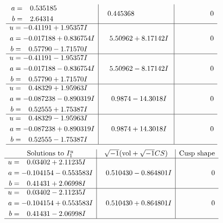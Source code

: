 \documentclass[1p]{elsarticle_modified}
\theoremstyle{definition}
\newcommand{\I}{\sqrt{-1}}
\begin{document}
$$\begin{array}{c|c|c}
\begin{aligned}
a &= \phantom{-}0.535185\phantom{ +0.000000I} \\
b &= \phantom{-}2.64314\phantom{ +0.000000I}\end{aligned}
 & \phantom{-}0.445368\phantom{ +0.000000I} & \phantom{-0.000000 } 0 \\ \hline\begin{aligned}
u &= -0.41191 + 1.95357 I \\
a &= -0.017188 + 0.836754 I \\
b &= \phantom{-}0.57790 - 1.71570 I\end{aligned}
 & \phantom{-}5.50962 + 8.17142 I & \phantom{-0.000000 } 0 \\ \hline\begin{aligned}
u &= -0.41191 - 1.95357 I \\
a &= -0.017188 - 0.836754 I \\
b &= \phantom{-}0.57790 + 1.71570 I\end{aligned}
 & \phantom{-}5.50962 - 8.17142 I & \phantom{-0.000000 } 0 \\ \hline\begin{aligned}
u &= \phantom{-}0.48329 + 1.95963 I \\
a &= -0.087238 - 0.890319 I \\
b &= \phantom{-}0.52555 + 1.75387 I\end{aligned}
 & \phantom{-}0.9874 - 14.3018 I & \phantom{-0.000000 } 0 \\ \hline\begin{aligned}
u &= \phantom{-}0.48329 - 1.95963 I \\
a &= -0.087238 + 0.890319 I \\
b &= \phantom{-}0.52555 - 1.75387 I\end{aligned}
 & \phantom{-}0.9874 + 14.3018 I & \phantom{-0.000000 } 0\\
 \hline 
 \end{array}$$\newpage$$\begin{array}{c|c|c}  
\text{Solutions to }I^u_{1}& \I (\text{vol} + \sqrt{-1}CS) & \text{Cusp shape}\\
 \hline 
\begin{aligned}
u &= \phantom{-}0.03402 + 2.11235 I \\
a &= -0.104154 - 0.553583 I \\
b &= \phantom{-}0.41431 + 2.06998 I\end{aligned}
 & \phantom{-}0.510430 - 0.864801 I & \phantom{-0.000000 } 0 \\ \hline\begin{aligned}
u &= \phantom{-}0.03402 - 2.11235 I \\
a &= -0.104154 + 0.553583 I \\
b &= \phantom{-}0.41431 - 2.06998 I\end{aligned}
 & \phantom{-}0.510430 + 0.864801 I & \phantom{-0.000000 } 0\\
 \hline 
 \end{array}$$\newpage\newpage\renewcommand{\arraystretch}{1}
\end{document}
